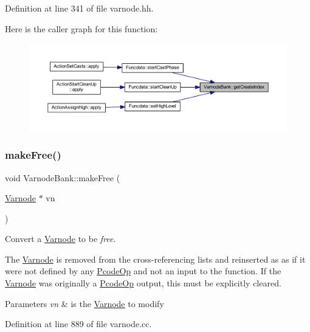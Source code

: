 Definition at line 341 of file varnode.\+hh.

Here is the caller graph for this function\+:
\nopagebreak
\begin{figure}[H]
\begin{center}
\leavevmode
\includegraphics[width=350pt]{class_varnode_bank_ab89d4b8688f2195cbdd4fd3a2b004f47_icgraph}
\end{center}
\end{figure}
\mbox{\label{class_varnode_bank_a8020195947e2b6faea7f18f591572c47}} 
\subsubsection{\texorpdfstring{makeFree()}{makeFree()}}
{\footnotesize\ttfamily void Varnode\+Bank\+::make\+Free (\begin{DoxyParamCaption}\item[{\mbox{\hyperlink{class_varnode}{Varnode}} $\ast$}]{vn }\end{DoxyParamCaption})}



Convert a \mbox{\hyperlink{class_varnode}{Varnode}} to be {\itshape free}. 

The \mbox{\hyperlink{class_varnode}{Varnode}} is removed from the cross-\/referencing lists and reinserted as as if it were not defined by any \mbox{\hyperlink{class_pcode_op}{Pcode\+Op}} and not an input to the function. If the \mbox{\hyperlink{class_varnode}{Varnode}} was originally a \mbox{\hyperlink{class_pcode_op}{Pcode\+Op}} output, this must be explicitly cleared. 
\begin{DoxyParams}{Parameters}
{\em vn} & is the \mbox{\hyperlink{class_varnode}{Varnode}} to modify \\
\hline
\end{DoxyParams}


Definition at line 889 of file varnode.\+cc.

